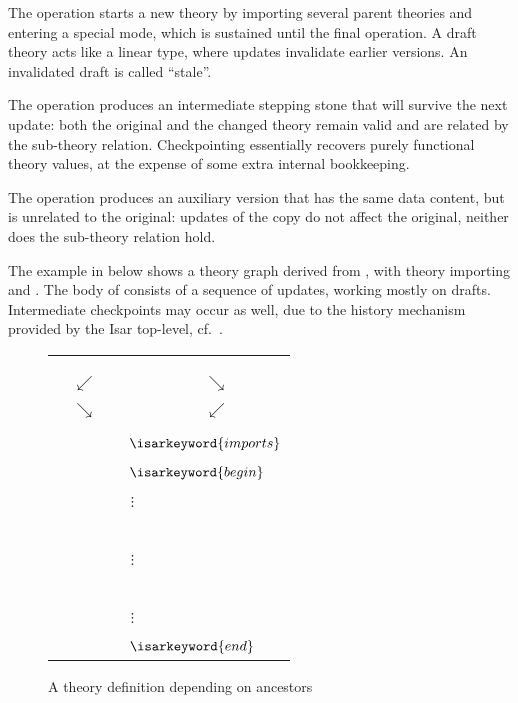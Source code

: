 \begin{isabellebody}
\begin{isamarkuptext}
  The  operation starts a new theory by importing
  several parent theories and entering a special  mode,
  which is sustained until the final  operation.  A draft
  theory acts like a linear type, where updates invalidate earlier
  versions.  An invalidated draft is called ``stale''.

  The  operation produces an intermediate stepping
  stone that will survive the next update: both the original and the
  changed theory remain valid and are related by the sub-theory
  relation.  Checkpointing essentially recovers purely functional
  theory values, at the expense of some extra internal bookkeeping.

  The  operation produces an auxiliary version that has
  the same data content, but is unrelated to the original: updates of
  the copy do not affect the original, neither does the sub-theory
  relation hold.

  \medskip The example in  below shows a theory
  graph derived from , with theory 
  importing  and .  The body of  consists of a sequence of updates, working mostly on
  drafts.  Intermediate checkpoints may occur as well, due to the
  history mechanism provided by the Isar top-level, cf.\
  .

  \begin{figure}[htb]
  \begin{center}
  \begin{tabular}{rcccl}
        &            & \isa{Pure} \\
        &            & \isa{{\isasymdown}} \\
        &            & \isa{FOL} \\
        & $\swarrow$ &              & $\searrow$ & \\
  \isa{Nat} &    &              &            & \isa{List} \\
        & $\searrow$ &              & $\swarrow$ \\
        &            & \isa{Length} \\
        &            & \multicolumn{3}{l}{~~$\isarkeyword{imports}$} \\
        &            & \multicolumn{3}{l}{~~$\isarkeyword{begin}$} \\
        &            & $\vdots$~~ \\
        &            & \isa{{\isasymbullet}}~~ \\
        &            & $\vdots$~~ \\
        &            & \isa{{\isasymbullet}}~~ \\
        &            & $\vdots$~~ \\
        &            & \multicolumn{3}{l}{~~$\isarkeyword{end}$} \\
  \end{tabular}
  \caption{A theory definition depending on ancestors}\label{fig:ex-theory}
  \end{center}
  \end{figure}


\end{isamarkuptext}
\end{isabellebody}
